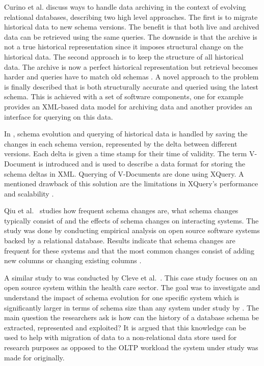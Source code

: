 
Curino et al. \cite{Moon09} discuss ways to handle data archiving in the context of evolving relational databases, describing two high level approaches. The first is to migrate historical data to new schema versions. The benefit is that both live and archived data can be retrieved using the same queries. The downside is that the archive is not a true historical representation since it imposes structural change on the historical data. The second approach is to keep the structure of all historical data. The archive is now a perfect historical representation but retrieval becomes harder and queries have to match old schemas \cite{Moon09}. A novel approach to the problem is finally described that is both structurally accurate and queried using the latest schema. This is achieved with a set of software components, one for example provides an XML-based data model for archiving data and another provides an interface for querying on this data.

In \cite{Moon05}, schema evolution and querying of historical data is handled by saving the changes in each schema version, represented by the delta between different versions. Each delta is given a time stamp for their time of validity. The term V-Document is introduced and is used to describe a data format for storing the schema deltas in XML. Querying of V-Documents are done using XQuery. A mentioned drawback of this solution are the limitations in XQuery's performance and scalability \cite{Moon05}.

Qiu et al.\ \cite{Co-evolutionOfSchemaAndCode} studies how frequent schema changes are, what schema changes typically consist of and the effects of schema changes on interacting systems. The study was done by conducting empirical analysis on open source software systems backed by a relational database. Results indicate that schema changes are frequent for these systems and that the most common changes consist of adding new columns or changing existing columns \cite{Co-evolutionOfSchemaAndCode}.

A similar study to \cite{Co-evolutionOfSchemaAndCode} was conducted by Cleve et al.\ \cite{Oscar}. This case study focuses on an open source system within the health care sector. The goal was to investigate and understand the impact of schema evolution for one specific system which is significantly larger in terms of schema size than any system under study by \cite{Co-evolutionOfSchemaAndCode}. The main question the researchers ask is how can the history of a database schema be extracted, represented and exploited? It is argued that this knowledge can be used to help with migration of data to a non-relational data store used for research purposes as opposed to the OLTP workload the system under study was made for originally.

